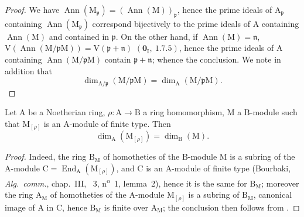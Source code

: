 \begin{proof}
We have $\operatorname{Ann}(\mathrm{M}_\mathfrak{p})=(\operatorname{Ann}(\mathrm{M}))_\mathfrak{p}$, hence the prime ideals of $\mathrm{A}_\mathfrak{p}$ containing $\operatorname{Ann}(\mathrm{M}_\mathfrak{p})$ correspond bijectively to the prime ideals of $\mathrm{A}$ containing $\operatorname{Ann}(\mathrm{M})$ and contained in $\mathfrak{p}$.
On the other hand, if $\operatorname{Ann}(\mathrm{M})=\mathfrak{n}$, $\mathrm{V}(\operatorname{Ann}(\mathrm{M}/\mathfrak{p}\mathrm{M}))=\mathrm{V}(\mathfrak{p}+\mathfrak{n})$ $(\mathbf{0}_\mathrm{I},~1.7.5)$, hence the prime ideals of $\mathrm{A}$ containing $\operatorname{Ann}(\mathrm{M}/\mathfrak{p}\mathrm{M})$ contain $\mathfrak{p}+\mathfrak{n}$; whence the conclusion.
We note in addition that
\begin{equation}
\label{0.16.1.8.2}
\tag{16.1.8.2}
  \dim_{\mathrm{A}/\mathfrak{p}}(\mathrm{M}/\mathfrak{p}\mathrm{M})=\dim_\mathrm{A}(\mathrm{M}/\mathfrak{p}\mathrm{M}).
\end{equation}
\end{proof}

\begin{proposition}[16.1.9]
\label{0.16.1.9}
Let $\mathrm{A}$ be a Noetherian ring, $\rho:\mathrm{A}\to\mathrm{B}$ a ring homomorphism, $\mathrm{M}$ a $\mathrm{B}$-module such that $\mathrm{M}_{[\rho]}$ is an $\mathrm{A}$-module of finite type.
Then
\begin{equation}
\label{0.16.1.9.1}
\tag{16.1.9.1}
  \dim_\mathrm{A}(\mathrm{M}_{[\rho]})=\dim_\mathrm{B}(\mathrm{M}).
\end{equation}
\end{proposition}

\begin{proof}
Indeed, the ring $\mathrm{B}_\mathrm{M}$ of homotheties of the $\mathrm{B}$-module $\mathrm{M}$ is a subring of the $\mathrm{A}$-module $\mathrm{C}=\operatorname{End}_\mathrm{A}(\mathrm{M}_{[\rho]})$, and $\mathrm{C}$ is an $\mathrm{A}$-module of finite type (Bourbaki, \emph{Alg.~comm.}, chap.~III, \textsection~3, n\textsuperscript{o}~1, lemma~2), hence it is the same for $\mathrm{B}_\mathrm{M}$; moreover the ring $\mathrm{A}_\mathrm{M}$ of homotheties of the $\mathrm{A}$-module $\mathrm{M}_{[\rho]}$ is a subring of $\mathrm{B}_\mathrm{M}$, canonical image of $\mathrm{A}$ in $\mathrm{C}$, hence $\mathrm{B}_\mathrm{M}$ is finite over $\mathrm{A}_\mathrm{M}$; the conclusion then follows from .
\end{proof}

